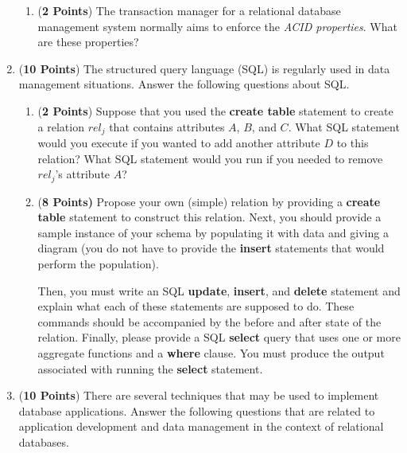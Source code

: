 \documentclass[12pt]{article}
\begin{document}
\begin{enumerate}
\begin{enumerate}
    \item ({\bf 2 Points}) The transaction manager for a relational
      database management system normally aims to enforce the {\em
        ACID properties}.  What are these properties?

    \end{enumerate}
      
\newpage

\item ({\bf 10 Points}) The structured query language (SQL) is
  regularly used in data management situations.  Answer the following
  questions about SQL.

  \begin{enumerate}
    
    \item ({\bf 2 Points}) Suppose that you used the {\bf create
      table} statement to create a relation $rel_j$ that contains
      attributes $A$, $B$, and $C$.  What SQL statement would you
      execute if you wanted to add another attribute $D$ to this
      relation?  What SQL statement would you run if you needed to
      remove $rel_j$'s attribute $A$?

    \item ({\bf 8 Points)} Propose your own (simple) relation by
      providing a {\bf create table} statement to construct this
      relation.  Next, you should provide a sample instance of your
      schema by populating it with data and giving a diagram (you do
      not have to provide the {\bf insert} statements that would
      perform the population).

      Then, you must write an SQL {\bf update}, {\bf insert}, and {\bf delete} statement and explain what each of these
      statements are supposed to do.  These commands should be accompanied by the before and after state of the
      relation.  Finally, please provide a SQL {\bf select} query that uses one or more aggregate functions and a {\bf
      where} clause.  You must produce the output associated with running the {\bf select} statement.

    \end{enumerate}

\newpage

\item ({\bf 10 Points}) There are several techniques that may be used
  to implement database applications.  Answer the following questions
  that are related to application development and data management in
  the context of relational databases.


\end{enumerate}
\end{document}
